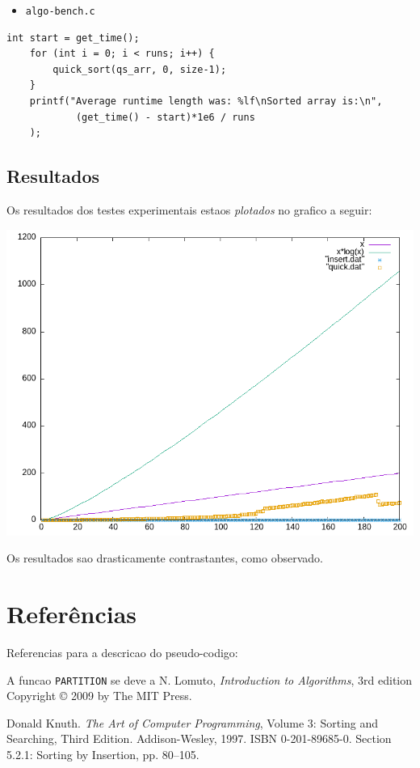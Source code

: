 \documentclass{article}
\begin{document}
\begin{itemize}
  \item{\texttt{algo-bench.c}}
\end{itemize}
\begin{verbatim}
int start = get_time();
    for (int i = 0; i < runs; i++) {
        quick_sort(qs_arr, 0, size-1);
    }
    printf("Average runtime length was: %lf\nSorted array is:\n",
            (get_time() - start)*1e6 / runs
    );
\end{verbatim}

\subsection{Resultados}

Os resultados dos testes experimentais estaos \textit{plotados} no grafico a seguir:

\includegraphics[scale=0.5]{graph}

Os resultados sao drasticamente contrastantes, como observado.

\section{Referências}

Referencias para a descricao do pseudo-codigo:

A funcao \texttt{PARTITION} se deve a N. Lomuto, \textit{Introduction to Algorithms}, 3rd edition Copyright © 2009 by The MIT Press.

Donald Knuth. \textit{The Art of Computer Programming}, Volume 3: Sorting and Searching, Third Edition. Addison-Wesley, 1997. ISBN 0-201-89685-0. Section 5.2.1: Sorting by Insertion, pp. 80–105.
\end{document}
